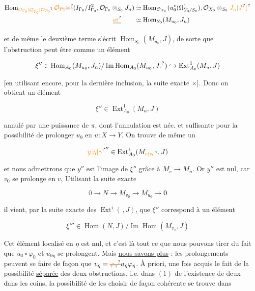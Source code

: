 \[
\begin{aligned}
\operatorname{Hom}_{\unsure{\mathcal O_{\Gamma_0}|\underline{\mathcal O}_{\Gamma_0}|\mathcal O_{P_0}}}\deleted{\unsure{\mathcal O_{P_0}\otimes}}(I_{\Gamma_0}/I_{\Gamma_0}^2,\mathcal O_{\Gamma_0}\otimes_{S_0}J_n)&\simeq\operatorname{Hom}_{\mathcal O_{X_0}}(u_0^*(\Omega^1_{Y_0/S_0}),\mathcal O_{X_0}\otimes_{S_0}\unsure{J_n|J}\unsure{)} \\
\deleted{\unsure{\text{et}}}\qquad &\simeq\operatorname{Hom}_{S_0}(M_{u_0},J_n)
\end{aligned}
\]

et de même le deuxième terme s'écrit $\operatorname{Hom}_{S_0}(M_{u_0},J)$, de sorte que l'obstruction peut être  comme un élément

\[
\xi''\in\operatorname{Hom}_{A_0}(M_{u_0},J_n)/\operatorname{Im}\operatorname{Hom}_{A_0}(M_{u_0},J\unsure{.})\hookrightarrow\operatorname{Ext}^{1}_{A_0}(M_u,J)
\]

[en utilisant encore, pour la dernière inclusion, la suite exacte $\times$]. Donc on obtient un élément 

\[
\xi''\in\operatorname{Ext}^{1}_{A_0}(M_u,J)
\]

annulé par une puissance de $\pi$, dont l'annulation est néc. et suffisante pour la possibilité de prolonger $u_0$ en $u:X\longrightarrow Y$. On trouve de même un

\[
\unsure{y|\eta|\gamma}''\in\operatorname{Ext}^{1}_{A_0}(M_{\unsure{v|v_0}},J)
\]

et nous admettrons que $y''$ est l'image de $\xi''$ grâce à $M_v\longrightarrow M_u$. Or \uline{$y''$ est nul}, car $v_0$ se prolonge en $v$,  Utilisant la suite exacte

\[
0\to N\to M_{v_0}\to M_{u_0}\to0
\]

il vient, par la suite exacte des $\operatorname{Ext}^{i}(\,,J)$, que $\xi''$ correspond à un élément

\[
\xi'''\in\operatorname{Hom}(N,J)/\operatorname{Im}\operatorname{Hom}(M_{v_0},J)
\]

 Cet élément localisé en $\eta$ est nul,  et c'est là tout ce que nous pouvons tirer du fait que $u_0\circ\varphi_0$ et $u_{0\eta}$ se prolongent. Mais \uline{nous savons plus} : les prolongements  peuvent se faire de façon que $v_\eta=\deleted{\unsure{\varphi_\eta}}u_\eta\varphi_\eta$. À priori,  une fois acquis le fait de la possibilité \uline{séparée} des deux obstructions, i.e. dans $(1)$ de l'existence de deux  dans les coins, la  possibilité de les choisir de façon cohérente se trouve dans

